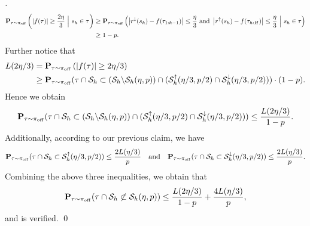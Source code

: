 \documentclass{article}
\begin{document}
\begin{proof}[]
    \begin{align*} 
        \mathbf{P}_{\tau\sim \pi_{\mathrm{off}}}\left(\left|f(\tau)\right| \ge \frac{2\eta}{3}\ \Big{|}\ s_h\in \tau\right) &\ge \mathbf{P}_{\tau\sim \pi_{\mathrm{off}}}\left(\left|r^\downarrow(s_h) - f(\tau_{1:h-1})\right|\le \frac{\eta}{3}\  \text{and}\  \left|r^\uparrow(s_h) - f(\tau_{h:H})\right|\le \frac{\eta}{3}\ \Big{|}\ s_h\in \tau\right)\\
        & \ge 1 - p.
    \end{align*}
    Further notice that
    \begin{align*} 
        L(2\eta/3) & = \mathbf{P}_{\tau\sim \pi_{\mathrm{off}}}\left(|f(\tau)|\ge 2\eta/3\right)\\
        & \ge \mathbf{P}_{\tau\sim \pi_{\mathrm{off}}}(\tau\cap \mathcal{S}_h\subset  (\mathcal{S}_h\backslash \mathcal{S}_h(\eta, p))\cap (\mathcal{S}_h^\uparrow(\eta/3, p/2)\cap \mathcal{S}_h^\downarrow(\eta/3, p/2)))\cdot (1 - p).
    \end{align*}
    Hence we obtain
    \[\mathbf{P}_{\tau\sim \pi_{\mathrm{off}}}(\tau\cap \mathcal{S}_h\subset (\mathcal{S}_h\backslash \mathcal{S}_h(\eta, p))\cap (\mathcal{S}_h^\uparrow(\eta/3, p/2)\cap \mathcal{S}_h^\downarrow(\eta/3, p/2)))\le \frac{L(2\eta/3)}{1-p}.\]
    Additionally, according to our previous claim, we have 
    \[\mathbf{P}_{\tau\sim \pi_{\mathrm{off}}}(\tau\cap\mathcal{S}_h\subset \mathcal{S}_h^\uparrow(\eta/3, p/2))\le \frac{2L(\eta/3)}{p}\quad\text{and}\quad \mathbf{P}_{\tau\sim \pi_{\mathrm{off}}}(\tau\cap \mathcal{S}_h\subset \mathcal{S}_h^\downarrow(\eta/3, p/2))\le \frac{2L(\eta/3)}{p}.\]
    Combining the above three inequalities, we obtain that 
    \[\mathbf{P}_{\tau\sim \pi_{\mathrm{off}}}(\tau\cap\mathcal{S}_h\not\subset \mathcal{S}_h(\eta, p))\le \frac{L(2\eta/3)}{1-p} + \frac{4L(\eta/3)}{p},\]
    and  is verified. \qed


\end{proof}
\end{document}
